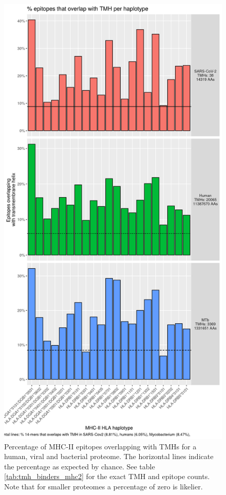\begin{figure}[!htbp]
  \includegraphics[height=0.8\textheight]{bbbq_1_smart_results/fig_f_tmh_mhc2_2_grid.png}
  \caption{
    Percentage of MHC-II epitopes overlapping with TMHs
    for a human, viral and bacterial proteome.
    The horizontal lines indicate the percentage as expected by chance.
    See table \ref{tab:tmh_binders_mhc2} for the exact TMH and epitope counts.
    Note that for smaller proteomes a percentage of zero is likelier.
  }
  \label{fig:2}
\end{figure}

